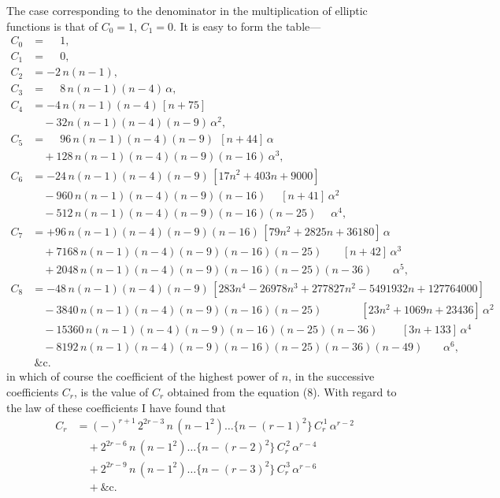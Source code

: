 \documentclass[12pt,a4paper]{article}
\theoremstyle{plain}
\begin{document}
The case corresponding to the denominator in the multiplication of elliptic functions is that of $C_0 = 1$, $C_1 = 0$. It is easy to form the table---
\begin{align*}
C_0 &= \phantom{-}1, \\
C_1 &= \phantom{-}0, \\
C_2 &= -2\,n(n-1), \\
C_3 &= \phantom{-}8\,n(n-1)(n-4)\,\alpha, \\
C_4 &= -4\,n(n-1)(n-4)\,[n+75] \\
  &\quad - 32n(n-1)(n-4)(n-9)\,\alpha^2, \\
C_5 &= \phantom{-}96\,n(n-1)(n-4)(n-9)\,\;[n+44]\,\alpha \\
  &\quad + 128\,n(n-1)(n-4)(n-9)(n-16)\,\alpha^3, \\
C_6 &= -24\,n(n-1)(n-4)(n-9)\,[17n^2 + 403n + 9000] \\
  &\quad - 960\,n(n-1)(n-4)(n-9)(n-16)\,\;\;\;\;[n+41]\,\alpha^2 \\
  &\quad - 512\,n(n-1)(n-4)(n-9)(n-16)(n-25)\,\;\;\;\;\alpha^4, \\
C_7 &= +96\,n(n-1)(n-4)(n-9)(n-16)\,[79n^2 + 2825n + 36180]\,\alpha \\
  &\quad + 7168\,n(n-1)(n-4)(n-9)(n-16)(n-25)\,\;\;\;\;\;\;[n+42]\,\alpha^3 \\
  &\quad + 2048\,n(n-1)(n-4)(n-9)(n-16)(n-25)(n-36)\,\;\;\;\;\;\;\alpha^5,\\[6pt]
C_8 &= -48\,n(n-1)(n-4)(n-9)\,[283n^4 - 26978n^3 + 277827n^2 - 5491932n + 127764000] \\
  &\quad - 3840\,n(n-1)(n-4)(n-9)(n-16)(n-25)\,\;\;\;\;\;\;\;\;\;\;\;\;[23n^2 + 1069n + 23436]\,\alpha^2 \\
  &\quad - 15360\,n(n-1)(n-4)(n-9)(n-16)(n-25)(n-36)\,\;\;\;\;\;\;\;[3n + 133]\,\alpha^4 \\
  &\quad - 8192\,n(n-1)(n-4)(n-9)(n-16)(n-25)(n-36)(n-49)\,\;\;\;\;\;\;\alpha^6, \\
  &\ \&\text{c.}
\end{align*}
in which of course the coefficient of the highest power of $n$, in the successive coefficients $C_r$, is the value of $C_r$ obtained from the equation (8). With regard to the law of these coefficients I have found that
\begin{align*}
C_r &= (-)^{r+1}\, 2^{2r-3}\, n\,(n-1^2) \ldots \{n-(r-1)^2\}\, C_r^{\,1}\, \alpha^{r-2} \\
  &\quad + 2^{2r-6}\, n\,(n-1^2) \ldots \{n-(r-2)^2\}\, C_r^{\,2}\, \alpha^{r-4} \\
  &\quad + 2^{2r-9}\, n\,(n-1^2) \ldots \{n-(r-3)^2\}\, C_r^{\,3}\, \alpha^{r-6} \\
  &\quad + \&\text{c.}
\end{align*}
\end{document}
